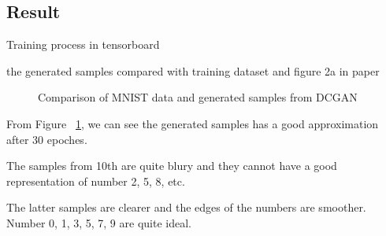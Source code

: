 \documentclass{article}
\begin{document}
\subsection{Result}

Training process in tensorboard



the generated samples compared with training dataset and figure 2a in paper

\begin{figure}[!htb]
  \centering
  \caption{Comparison of MNIST data and generated samples from DCGAN}
  \label{fig:DCGAN_MNIST}
\end{figure}

From Figure ~\ref{fig:DCGAN_MNIST}, 
we can see the generated samples has a good approximation after 30 epoches.

The samples from 10th are quite blury and they cannot have a good representation of number 2, 5, 8, etc.

The latter samples are clearer and the edges of the numbers are smoother. Number 0, 1, 3, 5, 7, 9 are quite ideal.
\end{document}
